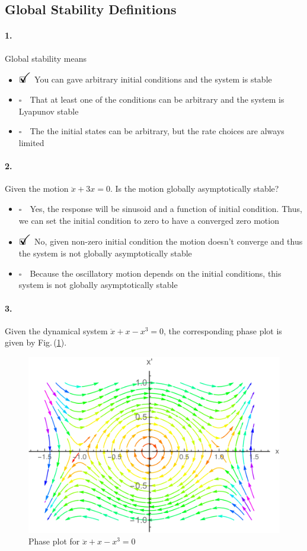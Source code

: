 \documentclass[12pt, a4paper]{article}
\newcommand{\ans}{\item[]$\rlap{\LARGE{\checkmark}}\square\quad$}
\newcommand{\noans}{\item[]$\square\quad$}
\begin{document}
\newpage
\subsection{Global Stability Definitions}
\paragraph{1.}
Global stability means
\begin{itemize}
\ans You can gave arbitrary initial conditions and the system is stable
\noans That at least one of the conditions can be arbitrary and the system is Lyapunov stable
\noans The the initial states can be arbitrary, but the rate choices are always limited
\end{itemize}

\paragraph{2.} Given the motion $\ddot{x} + 3 x = 0$. Is the motion globally asymptotically stable?

\begin{itemize}
\noans Yes, the response will be sinusoid and a function of initial condition. Thus, we can set the initial condition to zero to have a converged zero motion
\ans No, given non-zero initial condition the motion doesn't converge and thus the system is not globally asymptotically stable
\noans Because the oscillatory motion depends on the initial conditions, this system is not globally asymptotically stable
\end{itemize}

\paragraph{3.}
Given the dynamical system $\ddot{x}+x-x^{3}=0$, the corresponding phase plot is given by Fig.\,(\ref{fig_global_stability_phase_plot_1}).

\begin{figure}[ht]
\centering
\includegraphics[scale=0.3]{figs/fig_global_stability_phase_plot_1.png}
\caption{Phase plot for $\ddot{x}+x-x^{3}=0$}
\label{fig_global_stability_phase_plot_1}
\end{figure}
\end{document}
